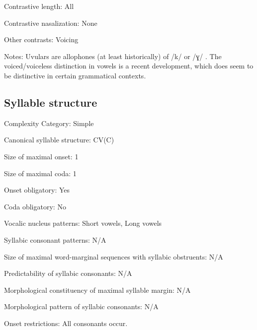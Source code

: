 {\begin{appendixdesc}
\item[Contrastive length:] All

\item[Contrastive nasalization:] None

\item[Other contrasts:] Voicing

\item[Notes:] Uvulars are allophones (at least historically) of /k/ or /ɣ/ \citep[26]{Givón2011}. The voiced/voiceless distinction in vowels is a recent development, which does seem to be distinctive in certain grammatical contexts.
\end{appendixdesc}
\subsection*{Syllable structure}
\begin{appendixdesc}

\item[Complexity Category:] Simple

\item[Canonical syllable structure:] CV(C) \citep[27--28]{Givón2011}

\item[Size of maximal onset:] 1

\item[Size of maximal coda:] 1

\item[Onset obligatory:] Yes

\item[Coda obligatory:] No

\item[Vocalic nucleus patterns:] Short vowels, Long vowels

\item[Syllabic consonant patterns:] N/A

\item[Size of maximal word-marginal sequences with syllabic obstruents:] N/A

\item[Predictability of syllabic consonants:] N/A

\item[Morphological constituency of maximal syllable margin:] N/A

\item[Morphological pattern of syllabic consonants:] N/A

\item[Onset restrictions:] All consonants occur.


\end{appendixdesc}}

